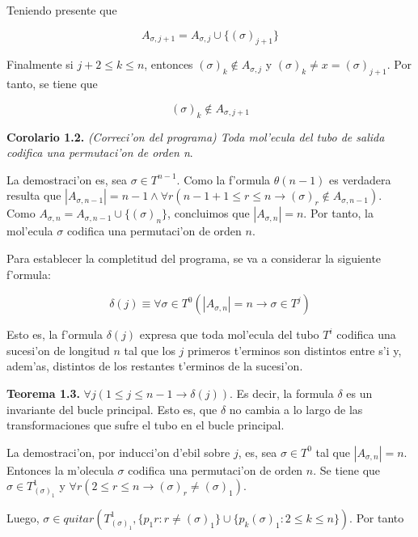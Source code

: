 \documentclass[12pt]{article}
\begin{document}
Teniendo presente que

\begin{equation*}
    A_{\sigma,j+1} = A_{\sigma,j} \cup \{(\sigma)_{j+1}\}
\end{equation*}

Finalmente si $j + 2 \leq k \leq n $, entonces $(\sigma)_{k} \notin A_{\sigma,j}$ y $(\sigma)_{k} \neq x = (\sigma)_{j+1}$.
Por tanto, se tiene que

\begin{equation*}
    (\sigma)_{k} \notin A_{\sigma,j+1}
\end{equation*}

\textbf{Corolario 1.2.} \textit{(Correci'on del programa) Toda mol'ecula del tubo de salida codifica una permutaci'on de
orden n}.

La demostraci'on es, sea $\sigma \in T^{n-1}$. Como la f'ormula $\theta(n-1)$ es verdadera resulta que
$|A_{\sigma,n-1}| = n - 1 \land \forall r (n - 1 + 1 \leq r \leq n \longrightarrow (\sigma)_{r} \notin A_{\sigma,n-1})$.
Como $A_{\sigma,n} = A_{\sigma,n-1} \cup \{(\sigma)_{n}\}$, concluimos que $|A_{\sigma,n}| = n$. Por tanto, la mol'ecula
$\sigma$ codifica una permutaci'on de orden $n$.

Para establecer la completitud del programa, se va a considerar la siguiente f'ormula:

\begin{equation*}
  \delta(j) \equiv \forall \sigma \in T^{0} (|A_{\sigma,n}| = n \longrightarrow \sigma \in T^{j})
\end{equation*}

Esto es, la f'ormula $\delta(j)$ expresa que toda mol'ecula del tubo $T^{i}$ codifica una sucesi'on de longitud $n$ tal que
los $j$ primeros t'erminos son distintos entre s'i y, adem'as, distintos de los restantes t'erminos de la sucesi'on.

\textbf{Teorema 1.3.} $\forall j (1 \leq j \leq n-1 \longrightarrow \delta(j))$. Es decir, la formula $\delta$ es un invariante del
bucle principal. Esto es, que $\delta$ no cambia a lo largo de las transformaciones que sufre el tubo en el bucle principal.

La demostraci'on, por inducci'on d'ebil sobre $j$, es, sea $\sigma \in  T^{0}$ tal que $|A_{\sigma,n}| = n$. Entonces
la m'olecula $\sigma$ codifica una permutaci'on de orden $n$. Se tiene que $\sigma \in T_{(\sigma)_{1}}^{1}$ y
$\forall r (2 \leq r \leq n \longrightarrow (\sigma)_{r} \neq (\sigma)_{1})$.

Luego, $\sigma \in quitar(T_{(\sigma)_{1}}^{1}, \{p_{1}r : r \neq (\sigma)_{1}\} \cup \{p_{k}(\sigma)_{1} : 2 \leq k \leq n\})$.
Por tanto
\end{document}
